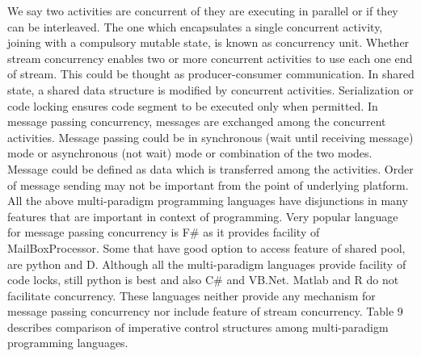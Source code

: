 \documentclass{sig-alternate}
\begin{document}
	We say two activities are concurrent of they are executing in parallel or if they can be interleaved. The one which encapsulates a single concurrent activity, joining with a compulsory mutable state, is known as concurrency unit. Whether stream concurrency enables two or more concurrent activities to use each one end of stream. This could be thought as producer-consumer communication. In shared state, a shared data structure is modified by concurrent activities. Serialization or code locking ensures code segment to be executed only when permitted. In message passing concurrency, messages are exchanged among the concurrent activities. Message passing could be in synchronous (wait until receiving message) mode or asynchronous (not wait) mode or combination of the two modes. Message could be defined as data which is transferred among the activities. Order of message sending may not be important from the point of underlying platform.\\
	All the above multi-paradigm programming languages have disjunctions in many features that are important in context of programming. Very popular language for message passing concurrency is F\# as it provides facility of MailBoxProcessor. Some that have good option to access feature of shared pool, are python and D. Although all the multi-paradigm languages provide facility of code locks, still python is best and also C\# and VB.Net. Matlab and R do not facilitate concurrency. These languages neither provide any mechanism for message passing concurrency nor include feature of stream concurrency. Table 9 describes comparison of imperative control structures among multi-paradigm programming languages. \\
	
\end{document}
